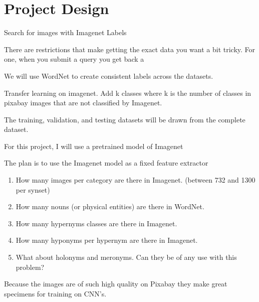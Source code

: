 \documentclass[10pt, a4paper, twocolumn]{article} %
\begin{document}
\section{Project Design} %


Search for images with Imagenet Labels

There are restrictions that make getting the exact data you want a bit tricky.  For one, when you submit a query you get back a  

We will use WordNet to create consistent labels across the datasets.

Transfer learning on imagenet.  Add k classes where k is the number of classes in pixabay images that are not classified by Imagenet.

The training, validation, and testing datasets will be drawn from the complete dataset.

For this project, I will use a pretrained model of Imagenet

The plan is to use the Imagenet model as a fixed feature extractor

\begin{enumerate}
	\item How many images per category are there in Imagenet. (between 732 and 1300 per synset)
	\item How many nouns (or physical entities) are there in WordNet.
	\item How many hypernyms classes are there in Imagenet. 
	\item How many hyponyms per hypernym are there in Imagenet.
	\item What about holonyms and meronyms. Can they be of any use with this problem?
\end{enumerate}

Because the images are of such high quality on Pixabay they make great specimens for training on CNN's.
\end{document}
